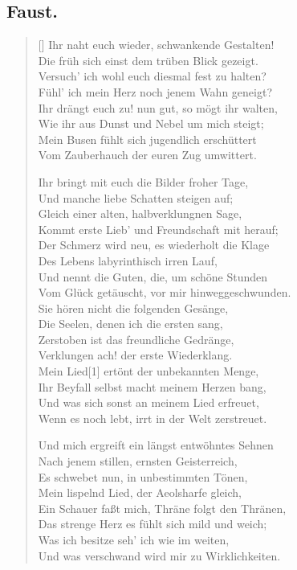 \documentclass[10pt]{lecturenotes}
\begin{document}
\begin{german}
\section*{Faust.}
\renewcommand{\poemtoc}{section}
\settowidth{\versewidth}{Ihr naht euch wieder, schwankende Gestalten!}
\begin{verse}[\versewidth]
Ihr naht euch wieder, schwankende Gestalten!\\
Die früh sich einst dem trüben Blick gezeigt.\\
Versuch’ ich wohl euch diesmal fest zu halten?\\
Fühl’ ich mein Herz noch jenem Wahn geneigt?\\
Ihr drängt euch zu! nun gut, so mögt ihr walten,\\
Wie ihr aus Dunst und Nebel um mich steigt;\\
Mein Busen fühlt sich jugendlich erschüttert\\
Vom Zauberhauch der euren Zug umwittert.

Ihr bringt mit euch die Bilder froher Tage,\\
Und manche liebe Schatten steigen auf;\\
Gleich einer alten, halbverklungnen Sage,\\
Kommt erste Lieb’ und Freundschaft mit herauf;\\
Der Schmerz wird neu, es wiederholt die Klage\\
Des Lebens labyrinthisch irren Lauf,\\
Und nennt die Guten, die, um schöne Stunden\\
Vom Glück getäuscht, vor mir hinweggeschwunden.\\
Sie hören nicht die folgenden Gesänge,\\
Die Seelen, denen ich die ersten sang,\\
Zerstoben ist das freundliche Gedränge,\\
Verklungen ach! der erste Wiederklang.\\
Mein Lied[1] ertönt der unbekannten Menge,\\
Ihr Beyfall selbst macht meinem Herzen bang,\\
Und was sich sonst an meinem Lied erfreuet,\\
Wenn es noch lebt, irrt in der Welt zerstreuet.

Und mich ergreift ein längst entwöhntes Sehnen\\
Nach jenem stillen, ernsten Geisterreich,\\
Es schwebet nun, in unbestimmten Tönen,\\
Mein lispelnd Lied, der Aeolsharfe gleich,\\
Ein Schauer faßt mich, Thräne folgt den Thränen,\\
Das strenge Herz es fühlt sich mild und weich;\\
Was ich besitze seh’ ich wie im weiten,\\
Und was verschwand wird mir zu Wirklichkeiten.
\end{verse}
\end{german}
\end{document}
